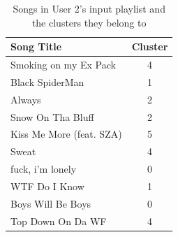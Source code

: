 \documentclass{article}
\begin{document}






\begin{table}[H]
\centering
\begin{tabular}{lc}
\toprule
\textbf{Song Title}           & \textbf{Cluster} \\ \hline
Smoking on my Ex Pack    & 4       \\
Black SpiderMan          & 1       \\
Always                   & 2       \\
Snow On Tha Bluff        & 2       \\
Kiss Me More (feat. SZA) & 5       \\
Sweat                    & 4       \\
fuck, i'm lonely         & 0       \\
WTF Do I Know            & 1       \\
Boys Will Be Boys        & 0       \\ 
Top Down On Da WF        & 4       \\ \hline
\end{tabular}%
\\[1ex]
\caption{Songs in User 2's input playlist and the clusters they belong to}
\label{tab:my-table1}
\end{table}
\end{document}
